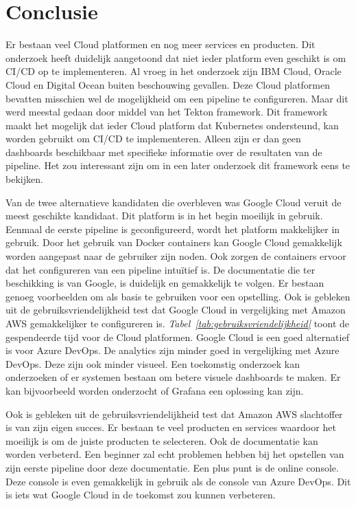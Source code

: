 
\chapter{Conclusie}
\label{ch:conclusie}
Er bestaan veel Cloud platformen en nog meer services en producten. Dit onderzoek heeft duidelijk aangetoond dat niet ieder platform even geschikt is om CI/CD op te implementeren. Al vroeg in het onderzoek zijn IBM Cloud, Oracle Cloud en Digital Ocean buiten beschouwing gevallen. Deze Cloud platformen bevatten misschien wel de mogelijkheid om een pipeline te configureren. Maar dit werd meestal gedaan door middel van het Tekton framework. Dit framework maakt het mogelijk dat ieder Cloud platform dat Kubernetes ondersteund, kan worden gebruikt om CI/CD te implementeren. Alleen zijn er dan geen dashboards beschikbaar met specifieke informatie over de resultaten van de pipeline. Het zou interessant zijn om in een later onderzoek dit framework eens te bekijken.

Van de twee alternatieve kandidaten die overbleven was Google Cloud veruit de meest geschikte kandidaat. Dit platform is in het begin moeilijk in gebruik. Eenmaal de eerste pipeline is geconfigureerd, wordt het platform makkelijker in gebruik. Door het gebruik van Docker containers kan Google Cloud gemakkelijk worden aangepast naar de gebruiker zijn noden. Ook zorgen de containers ervoor dat het configureren van een pipeline intuïtief is. De documentatie die ter beschikking is van Google, is duidelijk en gemakkelijk te volgen. Er bestaan genoeg voorbeelden om als basis te gebruiken voor een opstelling. Ook is gebleken uit de gebruiksvriendelijkheid test dat Google Cloud in vergelijking met Amazon AWS gemakkelijker te configureren is. \emph{Tabel~\ref{tab:gebruiksvriendelijkheid}} toont de gespendeerde tijd voor de Cloud platformen. Google Cloud is een goed alternatief is voor Azure DevOps. De analytics zijn minder goed in vergelijking met Azure DevOps. Deze zijn ook minder visueel. Een toekomstig onderzoek kan onderzoeken of er systemen bestaan om betere visuele dashboards te maken. Er kan bijvoorbeeld worden onderzocht of Grafana een oplossing kan zijn.

Ook is gebleken uit de gebruiksvriendelijkheid test dat Amazon AWS slachtoffer is van zijn eigen succes. Er bestaan te veel producten en services waardoor het moeilijk is om de juiste producten te selecteren. Ook de documentatie kan worden verbeterd. Een beginner zal echt problemen hebben bij het opstellen van zijn eerste pipeline door deze documentatie. Een plus punt is de online console. Deze console is even gemakkelijk in gebruik als de console van Azure DevOps. Dit is iets wat Google Cloud in de toekomst zou kunnen verbeteren.

